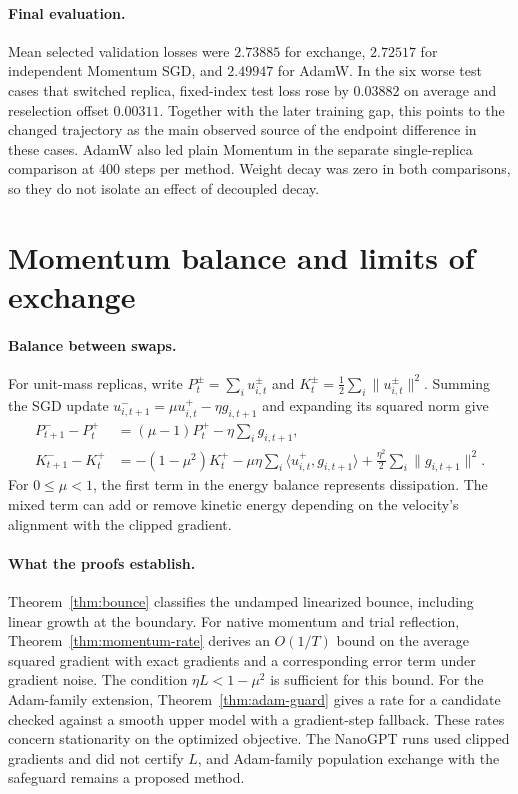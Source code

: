 \documentclass[10pt,letterpaper]{article}
\begin{document}
\paragraph{Final evaluation.}
Mean selected validation losses were \(2.73885\) for exchange, \(2.72517\) for independent Momentum SGD, and \(2.49947\) for AdamW. In the six worse test cases that switched replica, fixed-index test loss rose by \(0.03882\) on average and reselection offset \(0.00311\). Together with the later training gap, this points to the changed trajectory as the main observed source of the endpoint difference in these cases. AdamW also led plain Momentum in the separate single-replica comparison at 400 steps per method. Weight decay was zero in both comparisons, so they do not isolate an effect of decoupled decay.

\clearpage
\section{Momentum balance and limits of exchange}
\label{sec:balance}

\paragraph{Balance between swaps.}
For unit-mass replicas, write \(P_t^{\pm}=\sum_i u_{i,t}^{\pm}\) and \(K_t^{\pm}=\tfrac12\sum_i\|u_{i,t}^{\pm}\|^2\). Summing the SGD update \(u_{i,t+1}^{-}=\mu u_{i,t}^{+}-\eta g_{i,t+1}\) and expanding its squared norm give
\begin{align*}
P_{t+1}^{-}-P_t^{+}
  &= (\mu-1)P_t^{+}-\eta\sum_i g_{i,t+1},\\
K_{t+1}^{-}-K_t^{+}
  &= -(1-\mu^2)K_t^{+}
     -\mu\eta\sum_i\langle u_{i,t}^{+},g_{i,t+1}\rangle
     +\tfrac{\eta^2}{2}\sum_i\|g_{i,t+1}\|^2 .
\end{align*}
For \(0\le\mu<1\), the first term in the energy balance represents dissipation. The mixed term can add or remove kinetic energy depending on the velocity's alignment with the clipped gradient.

\paragraph{What the proofs establish.}
Theorem~\ref{thm:bounce} classifies the undamped linearized bounce, including linear growth at the boundary. For native momentum and trial reflection, Theorem~\ref{thm:momentum-rate} derives an \(O(1/T)\) bound on the average squared gradient with exact gradients and a corresponding error term under gradient noise. The condition \(\eta L<1-\mu^2\) is sufficient for this bound. For the Adam-family extension, Theorem~\ref{thm:adam-guard} gives a rate for a candidate checked against a smooth upper model with a gradient-step fallback. These rates concern stationarity on the optimized objective. The NanoGPT runs used clipped gradients and did not certify \(L\), and Adam-family population exchange with the safeguard remains a proposed method.
\end{document}
